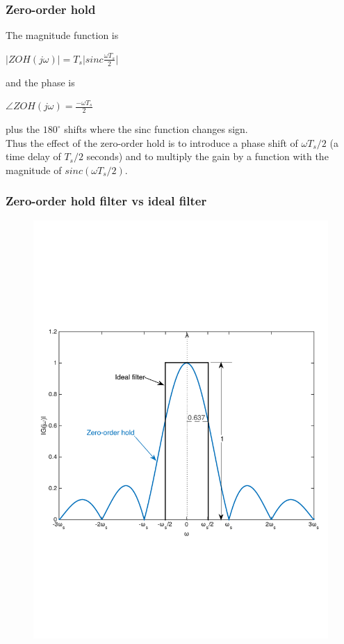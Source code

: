 \begin{frame}
	\frametitle{Zero-order hold}
	The magnitude function is\\
	\vspace{-1ex}
	\begin{center}
		$|ZOH(j\omega)| = T_s\Big|sinc\frac{\omega T_s}{2} \Big|$
	\end{center}
	\vspace{-1ex}
	and the phase is\\
	\vspace{-1ex}
	\begin{center}
		$\angle ZOH(j\omega)=\frac{-\omega T_s}{2}$
	\end{center}
	\vspace{-1ex}
	plus the $180^\circ$ shifts where the sinc function changes sign.\\
	\vspace{1em}
	Thus the effect of the zero-order hold is to introduce a phase shift of $\omega T_s/2$ (a time delay of $T_s/2$ seconds) and to multiply the gain by a function with the magnitude of $sinc(\omega T_s/2)$.
\end{frame}

\begin{frame}
	\frametitle{Zero-order hold filter vs ideal filter}
	\begin{figure}
		\includegraphics[width=0.8\linewidth]{zo_vs_ideal}
	\end{figure}
\end{frame}

